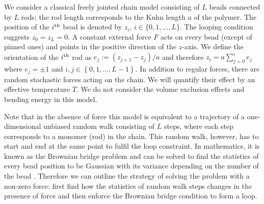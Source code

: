 \documentclass[aps,showpacs,twocolumn,floatfix,prx,superscriptaddress]{revtex4-1}
\begin{document}
We consider a classical freely jointed chain model consisting of $L$ beads connected by $L$ rods; the rod length corresponds to the Kuhn length $a$ of the polymer. The position of the $i^{\rm th}$ bead is denoted by $z_i$, $i\in\{0,1, \ldots,L\}$. The looping condition suggests $z_0=z_L=0$. A constant external force $F$ acts on every bead (except of pinned ones) and points in the positive direction of the $z$-axis.  We define the orientation of the $i^{\rm th}$ rod as $e_j:=(z_{j+1} - z_{j})/a$ and therefore $z_i =
a\sum_{j=0}^{i} e_j$ where $e_j=\pm 1$ and $i,j \in \left\{0, 1, \ldots,
    L-1\right\}$. In addition to regular forces, there are random stochastic forces acting on the chain. We will quantify their effect by an effective temperature $T$. We do not consider the volume exclusion effects and bending
energy in this model.

Note that in the absence of force this model is equivalent to a trajectory of a one-dimensional unbiased random walk consisting of $L$ steps, where each step corresponds to a monomer (rod) in the chain. This random walk, however, has to start and end at the same point to fulfil the loop constraint. In mathematics, it is known as the Brownian bridge problem and can be solved to find the statistics of every bead position to be Gaussian with its variance depending on the number of the bead \cite{}. Therefore we can outline the strategy of solving the problem with a non-zero force: first find how the statistics of random walk steps changes in the presence of force and then enforce the Brownian bridge condition to form a loop. 
\end{document}
